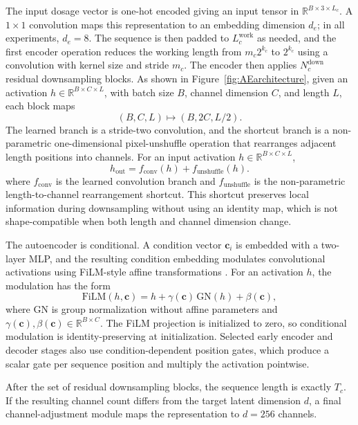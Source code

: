 \documentclass{article}
\begin{document}
The input dosage vector is one-hot encoded giving an input tensor in \(\mathbb R^{B\times 3\times L_c}\). A \(1\times 1\) convolution maps this representation to an embedding dimension \(d_e\); in all experiments, \(d_e=8\). The sequence is then padded to \(L_c^{\mathrm{work}}\) as needed, and the first encoder operation reduces the working length from \(m_c2^{k_c}\) to \(2^{k_c}\) using a convolution with kernel size and stride \(m_c\). The encoder then applies \(N_c^{\mathrm{down}}\) residual downsampling blocks. As shown in Figure~\ref{fig:AEarchitecture}, given an activation \(h\in\mathbb R^{B\times C\times L}\), with batch size $B$, channel dimension $C$, and length $L$, each block maps
\[
(B,C,L) \mapsto (B,2C,L/2).
\]
The learned branch is a stride-two convolution, and the shortcut branch is a non-parametric one-dimensional pixel-unshuffle operation that rearranges adjacent length positions into channels. For an input activation \(h\in\mathbb R^{B\times C\times L}\),
\[
h_{\mathrm{out}}
=
f_{\mathrm{conv}}(h)
+
f_{\mathrm{unshuffle}}(h).
\]
where \(f_{\mathrm{conv}}\) is the learned convolution branch and \(f_{\mathrm{unshuffle}}\) is the non-parametric length-to-channel rearrangement shortcut. This shortcut preserves local information during downsampling without using an identity map, which is not shape-compatible when both length and channel dimension change.

The autoencoder is conditional. A condition vector \(\boldsymbol c_i\) is embedded with a two-layer MLP, and the resulting condition embedding modulates convolutional activations using FiLM-style affine transformations \cite{perez2018film}. For an activation \(h\), the modulation has the form
\[
\mathrm{FiLM}(h,\boldsymbol c)
=
h + \gamma(\boldsymbol c)\,\mathrm{GN}(h)+\beta(\boldsymbol c),
\]
where \(\mathrm{GN}\) is group normalization without affine parameters and \(\gamma(\boldsymbol c),\beta(\boldsymbol c)\in\mathbb R^{B\times C}\). The FiLM projection is initialized to zero, so conditional modulation is identity-preserving at initialization. Selected early encoder and decoder stages also use condition-dependent position gates, which produce a scalar gate per sequence position and multiply the activation pointwise. 

After the set of residual downsampling blocks, the sequence length is exactly \(T_c\). If the resulting channel count differs from the target latent dimension \(d\), a final channel-adjustment module maps the representation to \(d=256\) channels.
\end{document}
